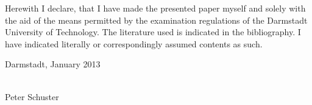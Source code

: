 \newpage

\thispagestyle{empty}
\cleardoublepage
\vspace*{9cm}

Herewith I declare, that I have made the presented paper myself and solely with the aid of the means permitted by the examination regulations of the Darmstadt University of Technology.
The literature used is indicated in the bibliography.
I have indicated literally or correspondingly assumed contents as such.

\vspace*{3cm}

Darmstadt, January 2013\\

\vspace*{5mm}


\parbox{7cm}{\hrulefill}\\
\hspace*{0,3cm} Peter Schuster

\endinput
